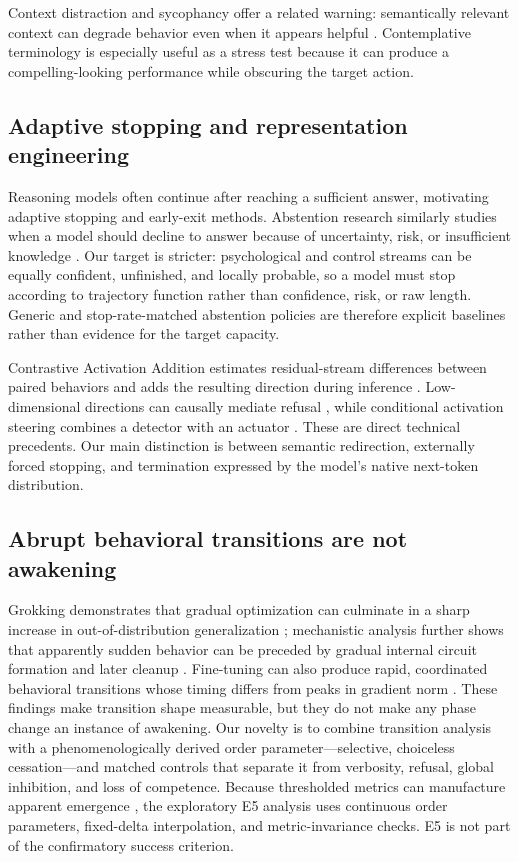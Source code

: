 \documentclass[10pt,twocolumn]{article}
\begin{document}
Context distraction and sycophancy offer a related warning: semantically
relevant context can degrade behavior even when it appears helpful
\citep{shi2023distracted}. Contemplative terminology is especially useful as a
stress test because it can produce a compelling-looking performance while
obscuring the target action.

\subsection{Adaptive stopping and representation engineering}

Reasoning models often continue after reaching a sufficient answer, motivating
adaptive stopping and early-exit methods. Abstention research similarly studies
when a model should decline to answer because of uncertainty, risk, or insufficient
knowledge \citep{wen2025abstention}. Our target is stricter: psychological and
control streams can be equally confident, unfinished, and locally probable, so a
model must stop according to trajectory function rather than confidence, risk,
or raw length. Generic and stop-rate-matched abstention policies are therefore
explicit baselines rather than evidence for the target capacity.

Contrastive Activation Addition estimates residual-stream differences between
paired behaviors and adds the resulting direction during inference
\citep{rimsky2024caa}. Low-dimensional directions can causally mediate refusal
\citep{arditi2024refusal}, while conditional activation steering combines a
detector with an actuator \citep{lee2025conditional}. These are direct technical
precedents. Our main distinction is between semantic redirection, externally
forced stopping, and termination expressed by the model's native next-token
distribution.

\subsection{Abrupt behavioral transitions are not awakening}

Grokking demonstrates that gradual optimization can culminate in a sharp increase
in out-of-distribution generalization \citep{power2022grokking}; mechanistic
analysis further shows that apparently sudden behavior can be preceded by gradual
internal circuit formation and later cleanup \citep{nanda2023progress}.
Fine-tuning can also produce rapid, coordinated behavioral transitions whose
timing differs from peaks in gradient norm \citep{arnold2025phase}. These
findings make transition shape measurable, but they do not make any phase change
an instance of awakening. Our novelty is to combine transition analysis with a
phenomenologically derived order parameter---selective, choiceless cessation---and
matched controls that separate it from verbosity, refusal, global inhibition, and
loss of competence. Because thresholded metrics can manufacture apparent
emergence \citep{schaeffer2023mirage}, the exploratory E5 analysis uses continuous
order parameters, fixed-delta interpolation, and metric-invariance checks. E5 is
not part of the confirmatory success criterion.
\end{document}
